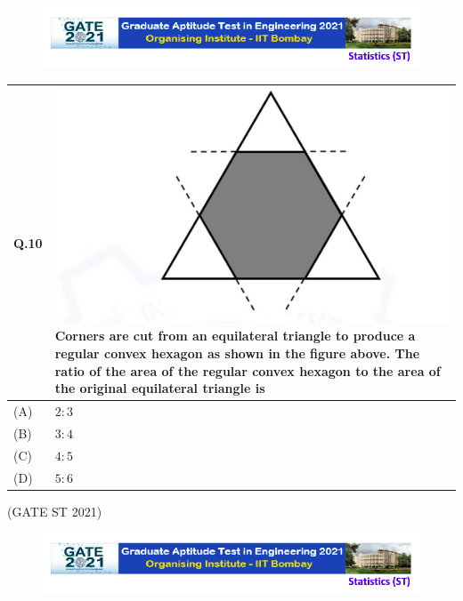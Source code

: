\documentclass[journal,12pt,onecolumn]{IEEEtran}
\theoremstyle{remark}
\begin{document}
\newpage
\begin{figure}
\huge\centering
    \includegraphics[width=1\linewidth]{figs/0.png}
\end{figure}
\begin{tabular}{|p{1cm}|p{12.5cm}|}

\hline
\textbf{Q.10} &   \includegraphics[width=1\linewidth]{figs/5.png}
\textbf{Corners are cut from an equilateral triangle to produce a regular convex hexagon as shown in the figure above. }
\textbf{The ratio of the area of the regular convex hexagon to the area of the original equilateral triangle is}

\bigskip
\\
\hline
(A) & $2:3$ \\
\hline
(B) & $3:4$ \\
\hline
(C) & $4:5$ \\
\hline
(D) & $5:6$ \\
\hline
\end{tabular}

\bigskip
\hfill (GATE ST 2021)
\\

\newpage
\begin{figure}
\huge\centering
    \includegraphics[width=1\linewidth]{figs/0.png}
\end{figure}
\end{document}
